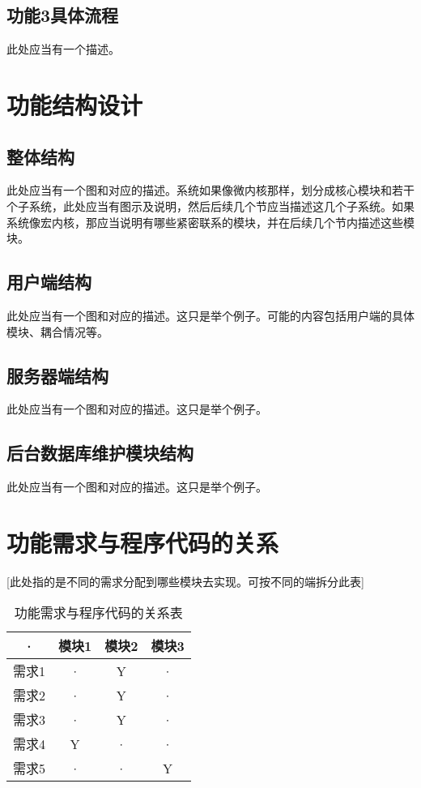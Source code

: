 \subsection{功能3具体流程}
此处应当有一个描述。



\section{功能结构设计}
\subsection{整体结构}
此处应当有一个图和对应的描述。系统如果像微内核那样，划分成核心模块和若干个子系统，此处应当有图示及说明，然后后续几个节应当描述这几个子系统。如果系统像宏内核，那应当说明有哪些紧密联系的模块，并在后续几个节内描述这些模块。

\subsection{用户端结构}
此处应当有一个图和对应的描述。这只是举个例子。可能的内容包括用户端的具体模块、耦合情况等。

\subsection{服务器端结构}
此处应当有一个图和对应的描述。这只是举个例子。

\subsection{后台数据库维护模块结构}
此处应当有一个图和对应的描述。这只是举个例子。



\section{功能需求与程序代码的关系}
[此处指的是不同的需求分配到哪些模块去实现。可按不同的端拆分此表]
\begin{table}[htbp]
\centering
\caption{功能需求与程序代码的关系表} \label{tab:requirement-module}
\begin{tabular}{|c|c|c|c|}
    \hline
    · & 模块1 & 模块2 & 模块3 \\
    \hline
    需求1 & · & Y & · \\
    \hline
    需求2 & · & Y & · \\
    \hline
    需求3 & · & Y & · \\
    \hline
    需求4 & Y & · & · \\
    \hline
    需求5 & · & · & Y \\
    \hline
\end{tabular}
\end{table}